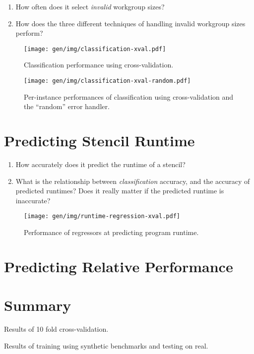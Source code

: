 \begin{enumerate}
\item How often does it select \emph{invalid} workgroup sizes?
\item How does the three different techniques of handling invalid
  workgroup sizes perform?
\end{enumerate}

\begin{figure}
\centering
\texttt{[image: gen/img/classification-xval.pdf]}
\caption{%
  Classification performance using cross-validation.%
}
\end{figure}

\begin{figure}
\centering
\texttt{[image: gen/img/classification-xval-random.pdf]}
\caption{%
  Per-instance performances of classification using cross-validation
  and the ``random'' error handler.%
}
\end{figure}





\section{Predicting Stencil Runtime}

\begin{enumerate}
\item How accurately does it predict the runtime of a stencil?
\item What is the relationship between \emph{classification} accuracy,
  and the accuracy of predicted runtimes? Does it really matter if the
  predicted runtime is inaccurate?
\end{enumerate}

\begin{figure}
\centering
\texttt{[image: gen/img/runtime-regression-xval.pdf]}
\caption{%
  Performance of regressors at predicting program runtime.%
}
\end{figure}


\section{Predicting Relative Performance}


\section{Summary}

\begin{table}
\scriptsize

\caption{Results of 10 fold cross-validation.}
\end{table}

\begin{table}
\scriptsize

\caption{Results of training using synthetic benchmarks and testing on
  real.}
\end{table}
